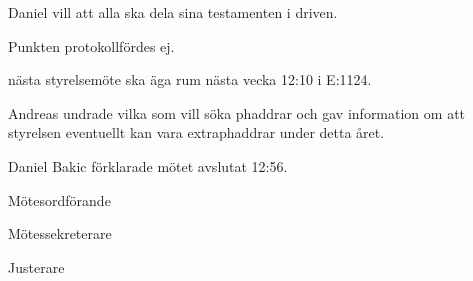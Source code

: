 \documentclass[10pt]{article}
\def\mo{Daniel Bakic}
\def\ms{Axel Voss}
\def\ji{Fanny Månefjord}
\begin{document}
\begin{paragrafer}
Daniel vill att alla ska dela sina testamenten i driven.


Punkten protokollfördes ej.

\Mba nästa styrelsemöte ska äga rum nästa vecka 12:10 i E:1124.


\Ibfu

Andreas undrade vilka som vill söka phaddrar och gav information om att styrelsen eventuellt kan vara extraphaddrar under detta året.

{\mo} förklarade mötet avslutat 12:56.
\end{paragrafer}

\hidesignfoot
\begin{signatures}{3}
\signature{\mo}{Mötesordförande}
\signature{\ms}{Mötessekreterare}
\signature{\ji}{Justerare}
\end{signatures}
\end{document}
